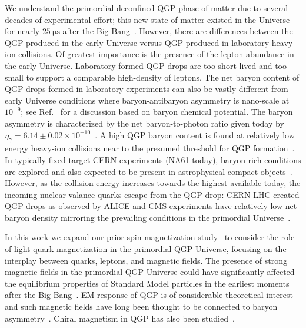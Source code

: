 \documentclass[epjST]{svjour}
\begin{document}
We understand the primordial deconfined QGP phase of matter due to several decades of experimental effort; this new state of matter existed in the Universe for nearly \(25~\mathrm{\mu s}\) after the Big-Bang~\cite{Rafelski:2019twp,Rafelski:2023emw,Rafelski:2024fej}. However, there are differences between the QGP produced in the early Universe versus QGP produced in laboratory heavy-ion collisions. Of greatest importance is the presence of the lepton abundance in the early Universe. Laboratory formed QGP drops are too short-lived and too small to support a comparable high-density of leptons. The net baryon content of QGP-drops formed in laboratory experiments can also be vastly different from early Universe conditions where baryon-antibaryon asymmetry is nano-scale {\color{blue}at \(10^{-9}\); see Ref.~\cite{Fromerth:2012fe} for a discussion based on baryon chemical potential. The baryon asymmetry is characterized by the net baryon-to-photon ratio given today by \(\eta_{\gamma}=6.14\pm0.02\times10^{-10}\)~\cite{ParticleDataGroup:2022pth}.} A high QGP baryon content is found at relatively low energy heavy-ion collisions near to the presumed threshold for QGP formation~\cite{Letessier:2005qe}. In typically fixed target CERN experiments (NA61 today), baryon-rich conditions are explored and also expected to be present in astrophysical compact objects~\cite{Ghosh:2025sjn}. However, as the collision energy increases towards the highest available today, the incoming nuclear valance quarks escape from the QGP drop: CERN-LHC created QGP-drops as observed by ALICE and CMS experiments have relatively low net baryon density mirroring the prevailing conditions in the primordial Universe~\cite{Letessier:2005qe}. 

In this work we expand our prior spin magnetization study~\cite{Steinmetz:2023nsc,Steinmetz:2023ucp} to consider the role of light-quark magnetization in the primordial QGP Universe, focusing on the interplay between quarks, leptons, and magnetic fields. The presence of strong magnetic fields in the primordial QGP Universe could have significantly affected the equilibrium properties of Standard Model particles in the earliest moments after the Big-Bang~\cite{Durrer:2013pga,Subramanian:2015lua}. EM response of QGP is of considerable theoretical interest~\cite{Grayson:2022asf,Shovkovy:2022bnd,Ghosh:2024fkg} and such magnetic fields have long been thought to be connected to baryon asymmetry~\cite{Vachaspati:1991nm,Baym:1995fk}. Chiral magnetism in QGP has also been studied~\cite{Fukushima:2008xe,Boyarsky:2011uy,Bali:2011qj}.
\end{document}
